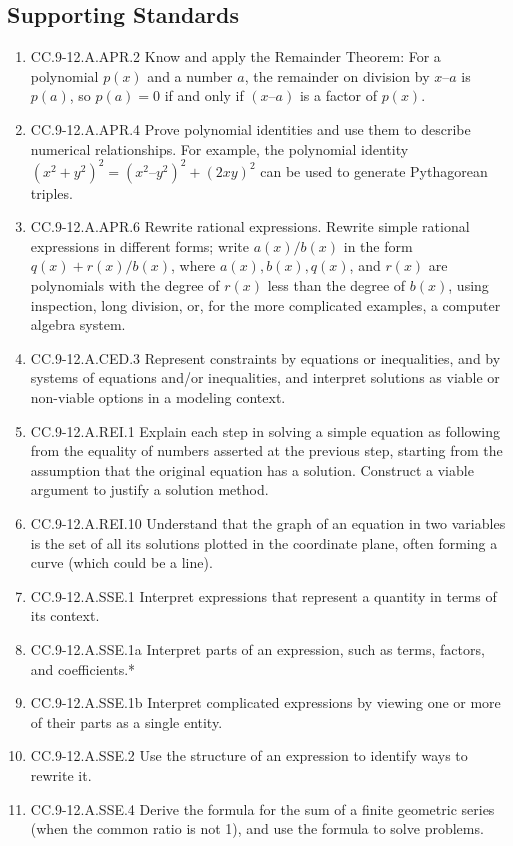 \documentclass{article}
\begin{document}
\subsection*{Supporting Standards}
\begin{enumerate}
	\item CC.9-12.A.APR.2 Know and apply the Remainder Theorem: For a polynomial $p(x)$ and a number $a$, the remainder on division by $x – a$ is $p(a)$, so $p(a) = 0$ if and only if $(x – a)$ is a factor of $p(x)$.
	\item CC.9-12.A.APR.4  Prove polynomial identities and use them to describe numerical relationships. For example, the polynomial identity $(x^2 + y^2)^2 = (x^2 – y^2)^2 + (2xy)^2$ can be used to generate Pythagorean triples.
	\item CC.9-12.A.APR.6 Rewrite rational expressions. Rewrite simple rational expressions in different forms; write $a(x)/b(x)$ in the form $q(x) + r(x)/b(x)$, where $a(x), b(x), q(x)$, and $r(x)$ are polynomials with the degree of $r(x)$ less than the degree of $b(x)$, using inspection, long division, or, for the more complicated examples, a computer algebra system.
	\item CC.9-12.A.CED.3  Represent constraints by equations or inequalities, and by systems of equations and/or inequalities, and interpret solutions as viable or non-viable options in a modeling context. 
	\item CC.9-12.A.REI.1   Explain each step in solving a simple equation as following from the equality of numbers asserted at the previous step, starting from the assumption that the original equation has a solution. Construct a viable argument to justify a solution method.
	\item CC.9-12.A.REI.10  Understand that the graph of an equation in two variables is the set of all its solutions plotted in the coordinate plane, often forming a curve (which could be a line).
	\item CC.9-12.A.SSE.1  Interpret expressions that represent a quantity in terms of its context.
	\item CC.9-12.A.SSE.1a Interpret parts of an expression, such as terms, factors, and coefficients.*
	\item CC.9-12.A.SSE.1b Interpret complicated expressions by viewing one or more of their parts as a single entity. 
	\item CC.9-12.A.SSE.2  Use the structure of an expression to identify ways to rewrite it. 
	\item CC.9-12.A.SSE.4  Derive the formula for the sum of a finite geometric series (when the common ratio is not 1), and use the formula to solve problems. 

\end{enumerate}
\end{document}
